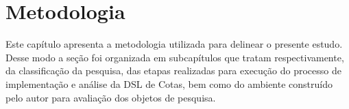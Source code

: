 \chapter{Metodologia}
\label{metodologia}

Este capítulo apresenta a metodologia utilizada para delinear o presente estudo. Desse modo a seção foi organizada em subcapítulos que tratam respectivamente, da classificação da pesquisa, das etapas realizadas para execução do processo de implementação e análise da DSL de Cotas, bem como do ambiente construído pelo autor para avaliação dos objetos de pesquisa.





 
 
 
 
 
 